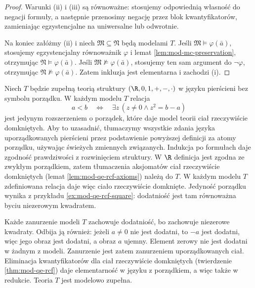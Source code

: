 \begin{proof}
Warunki (ii) i (iii) są równoważne: stosujemy odpowiednią
własność do negacji formuły, a następnie przenosimy
negację przez blok kwantyfikatorów, zamieniając
egzystencjalne na uniwersalne lub odwrotnie.

Na koniec załóżmy (ii) i niech
$\mathfrak M\subseteq\mathfrak N$ będą modelami $T$.
Jeśli $\mathfrak M\models\varphi(\bar a)$, stosujemy
egzystencjalny równoważnik $\varphi$ i lemat
\ref{lem:mod-mc-preservation}, otrzymując
$\mathfrak N\models\varphi(\bar a)$.
Jeśli $\mathfrak M\not\models\varphi(\bar a)$,
stosujemy ten sam argument do $\neg\varphi$,
otrzymując $\mathfrak N\not\models\varphi(\bar a)$.
Zatem inkluzja jest elementarna i zachodzi (i).
\end{proof}

\begin{przyklad}
\label{ex:mod-mc-no-qe}
Niech $T$ będzie zupełną teorią struktury $(\R,0,1,+,-,\cdot)$
w języku pierścieni bez symbolu porządku.
W każdym modelu $T$ relacja
\[
a<b\quad\Longleftrightarrow\quad
\exists z\,(z\ne0\land z^2=b-a)
\]
jest jedynym rozszerzeniem o porządek, które daje
model teorii ciał rzeczywiście domkniętych.
Aby to uzasadnić, tłumaczymy wszystkie zdania
języka uporządkowanych pierścieni przez podstawienie
powyższej definicji za atomy porządku, używając
świeżych zmiennych związanych. Indukcja po formułach
daje zgodność prawdziwości z rozwinięciem struktury.
W $\R$ definicja jest zgodna ze zwykłym porządkiem,
zatem tłumaczenia aksjomatów ciał rzeczywiście
domkniętych (lemat \ref{lem:mod-qe-rcf-axioms})
należą do $T$. W każdym modelu $T$ zdefiniowana
relacja daje więc ciało rzeczywiście domknięte.
Jedyność porządku wynika z przykładu
\ref{ex:mod-qe-rcf-square}: dodatniość jest tam
równoważna byciu niezerowym kwadratem.

Każde zanurzenie modeli $T$ zachowuje dodatniość,
bo zachowuje niezerowe kwadraty. Odbija ją również:
jeżeli $a\ne0$ nie jest dodatni, to $-a$ jest dodatni,
więc jego obraz jest dodatni, a obraz $a$ ujemny.
Element zerowy nie jest dodatni w żadnym z modeli.
Zanurzenie jest zatem zanurzeniem uporządkowanych ciał.
Eliminacja kwantyfikatorów dla ciał rzeczywiście
domkniętych (twierdzenie \ref{thm:mod-qe-rcf})
daje elementarność w języku z porządkiem,
a więc także w redukcie. Teoria $T$ jest modelowo zupełna.


\end{przyklad}
